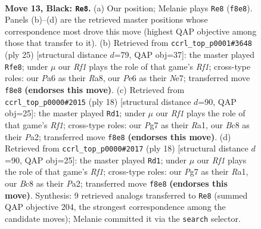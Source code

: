 \documentclass[11pt]{article}
\begin{document}
\clearpage

\begin{figure}[p]\centering
\begin{subfigure}{0.46\textwidth}\centering
\resizebox{\linewidth}{!}{%
\newchessgame
\chessboard[
  setfen={rnb2rk1/2pnq1pp/pp2p3/3pPp2/3P1P1P/8/PPPKN1P1/1R1Q1BNR b - - 1 13},
  showmover=false,
  pgfstyle=straightmove, color=movearrow, markmove={f8-e8}
]}
\caption{}
\end{subfigure}\hfill
\begin{subfigure}{0.46\textwidth}\centering
\resizebox{\linewidth}{!}{%
\newchessgame
\chessboard[
  setfen={r4rk1/1ppqnpbp/p2p1np1/8/3PP3/5N1P/PP1N1PP1/R1BQR1K1 b - - 0 13},
  showmover=false,
  pgfstyle=straightmove, color=movearrow, markmove={f8-e8}
]}
\caption{}
\end{subfigure}
\\[4pt]
\begin{subfigure}{0.46\textwidth}\centering
\resizebox{\linewidth}{!}{%
\newchessgame
\chessboard[
  setfen={rn1qk2r/pb1p1ppp/1p2pn2/8/2Pp4/5NP1/PPQ1PPBP/RN3RK1 w kq - 0 10},
  showmover=false,
  pgfstyle=straightmove, color=movearrow, markmove={f1-d1}
]}
\caption{}
\end{subfigure}\hfill
\begin{subfigure}{0.46\textwidth}\centering
\resizebox{\linewidth}{!}{%
\newchessgame
\chessboard[
  setfen={rn1qk2r/pb1p1ppp/1p2pn2/8/2Pp4/5NP1/PPQ1PPBP/RN3RK1 w kq - 0 10},
  showmover=false,
  pgfstyle=straightmove, color=movearrow, markmove={f1-d1}
]}
\caption{}
\end{subfigure}
\caption{\textbf{Move 13, Black: \texttt{Re8}.} (a) Our position; Melanie plays \texttt{Re8} (\texttt{f8e8}). Panels (b)--(d) are the retrieved master positions whose correspondence most drove this move (highest QAP objective among those that transfer to it). (b) Retrieved from \texttt{ccrl\_top\_p0001\#3648} (ply 25) [structural distance $d$=79, QAP obj=37]: the master played \texttt{Rfe8}; under $\mu$ our \emph{Rf1} plays the role of that game's \emph{Rf1}; cross-type roles: our \emph{P}a6 as their \emph{R}a8, our \emph{P}e6 as their \emph{N}e7; transferred move \texttt{f8e8} \textbf{(endorses this move)}. (c) Retrieved from \texttt{ccrl\_top\_p0000\#2015} (ply 18) [structural distance $d$=90, QAP obj=25]: the master played \texttt{Rd1}; under $\mu$ our \emph{Rf1} plays the role of that game's \emph{Rf1}; cross-type roles: our \emph{P}g7 as their \emph{R}a1, our \emph{B}c8 as their \emph{P}a2; transferred move \texttt{f8e8} \textbf{(endorses this move)}. (d) Retrieved from \texttt{ccrl\_top\_p0000\#2017} (ply 18) [structural distance $d$=90, QAP obj=25]: the master played \texttt{Rd1}; under $\mu$ our \emph{Rf1} plays the role of that game's \emph{Rf1}; cross-type roles: our \emph{P}g7 as their \emph{R}a1, our \emph{B}c8 as their \emph{P}a2; transferred move \texttt{f8e8} \textbf{(endorses this move)}. Synthesis: 9 retrieved analogs transferred to \texttt{Re8} (summed QAP objective 204, the strongest correspondence among the candidate moves); Melanie committed it via the \texttt{search} selector.}
\label{fig:thought-m25}
\end{figure}
\end{document}
